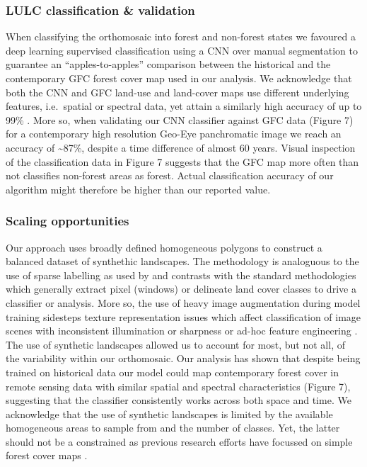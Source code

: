 \documentclass[remote sensing,article,submit,moreauthors,pdftex]{mdpi}
\begin{document}
\hypertarget{lulc-classification-validation}{%
\subsubsection{LULC classification \&
validation}\label{lulc-classification-validation}}

When classifying the orthomosaic into forest and non-forest states we
favoured a deep learning supervised classification using a CNN over
manual segmentation to guarantee an ``apples-to-apples'' comparison
between the historical and the contemporary GFC forest cover map used in
our analysis. We acknowledge that both the CNN and GFC land-use and
land-cover maps use different underlying features, i.e.~spatial or
spectral data, yet attain a similarly high accuracy of up to 99\%
\citep{hansen2013}. More so, when validating our CNN classifier against
GFC data (Figure 7) for a contemporary high resolution Geo-Eye
panchromatic image we reach an accuracy of \textasciitilde{}87\%,
despite a time difference of almost 60 years. Visual inspection of the
classification data in Figure 7 suggests that the GFC map more often
than not classifies non-forest areas as forest. Actual classification
accuracy of our algorithm might therefore be higher than our reported
value.

\hypertarget{scaling-opportunities}{%
\subsubsection{Scaling opportunities}\label{scaling-opportunities}}

Our approach uses broadly defined homogeneous polygons to construct a
balanced dataset of synthethic landscapes. The methodology is analoguous
to the use of sparse labelling as used by \citet{buscombe2018} and
contrasts with the standard methodologies which generally extract pixel
(windows) \citep{song2015} or delineate land cover classes
\citep{nita2018} to drive a classifier or analysis. More so, the use of
heavy image augmentation during model training sidesteps texture
representation issues which affect classification of image scenes with
inconsistent illumination or sharpness \citep{hudak1998} or ad-hoc
feature engineering \citep{song2015}. The use of synthetic landscapes
allowed us to account for most, but not all, of the variability within
our orthomosaic. Our analysis has shown that despite being trained on
historical data our model could map contemporary forest cover in remote
sensing data with similar spatial and spectral characteristics (Figure
7), suggesting that the classifier consistently works across both space
and time. We acknowledge that the use of synthetic landscapes is limited
by the available homogeneous areas to sample from and the number of
classes. Yet, the latter should not be a constrained as previous
research efforts have focussed on simple forest cover maps
\citep{hansen2013}.
\end{document}
